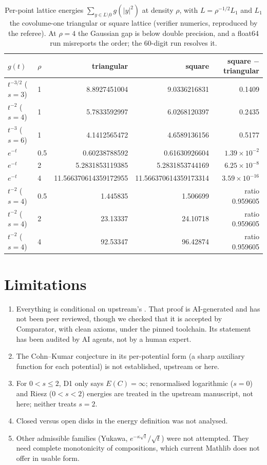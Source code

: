 \documentclass[11pt]{article}
\begin{document}
\begin{table}[h]
\centering\small
\begin{tabular}{llrrr}
\toprule
$g(t)$ & $\rho$ & triangular & square & square $-$ triangular\\
\midrule
$t^{-3/2}$ ($s=3$) & 1 & 8.8927451004 & 9.0336216831 & 0.1409\\
$t^{-2}$ ($s=4$) & 1 & 5.7833592997 & 6.0268120397 & 0.2435\\
$t^{-3}$ ($s=6$) & 1 & 4.1412565472 & 4.6589136156 & 0.5177\\
$e^{-t}$ & 0.5 & 0.60238788592 & 0.61630926604 & $1.39\times10^{-2}$\\
$e^{-t}$ & 2 & 5.2831853119385 & 5.2831853744169 & $6.25\times10^{-8}$\\
$e^{-t}$ & 4 & 11.566370614359172955 & 11.566370614359173314 & $3.59\times10^{-16}$\\
$t^{-2}$ ($s=4$) & 0.5 & 1.445835 & 1.506699 & ratio 0.959605\\
$t^{-2}$ ($s=4$) & 2 & 23.13337 & 24.10718 & ratio 0.959605\\
$t^{-2}$ ($s=4$) & 4 & 92.53347 & 96.42874 & ratio 0.959605\\
\bottomrule
\end{tabular}
\caption{Per-point lattice energies $\sum_{y\in L\setminus0}g(|y|^2)$ at density $\rho$, with $L=\rho^{-1/2}L_1$ and $L_1$ the covolume-one
triangular or square lattice (verifier numerics, reproduced by the referee). At $\rho=4$ the
Gaussian gap is below double precision, and a float64 run misreports the order; the 60-digit run resolves it.}\label{tab:num}
\end{table}

\section{Limitations}
\begin{enumerate}
\item Everything is conditional on upstream's . That proof is AI-generated and has not been peer reviewed, though we
checked that it is accepted by Comparator, with clean axioms, under the pinned toolchain. Its statement has been audited by AI agents, not by a
human expert.
\item The Cohn--Kumar conjecture in its per-potential form (a sharp auxiliary function for each potential) is not established, upstream or here.
\item For $0<s\le2$, D1 only says $E(C)=\infty$; renormalised logarithmic ($s=0$) and Riesz ($0<s<2$) energies are treated in the upstream manuscript, not here;
neither treats $s=2$.
\item Closed versus open disks in the energy definition was not analysed.
\item Other admissible families (Yukawa, $e^{-\kappa\sqrt t}/\sqrt t$) were not attempted. They need complete monotonicity of compositions,
which current Mathlib does not offer in usable form.
\end{enumerate}
\end{document}
